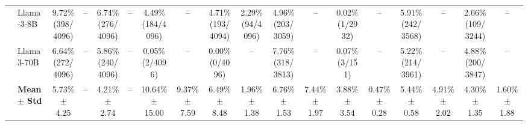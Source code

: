 \begin{table}[t]
{\begin{tabular}{ll*{16}{c}}
 & Llama-3-8B & \makecell[c]{9.72\%\\[-1pt]\scriptsize(398/4096)} & -- & \makecell[c]{6.74\%\\[-1pt]\scriptsize(276/4096)} & -- & \makecell[c]{4.49\%\\[-1pt]\scriptsize(184/4096)} & -- & \makecell[c]{4.71\%\\[-1pt]\scriptsize(193/4094)} & \makecell[c]{2.29\%\\[-1pt]\scriptsize(94/4096)} & \makecell[c]{4.96\%\\[-1pt]\scriptsize(203/3059)} & -- & \makecell[c]{0.02\%\\[-1pt]\scriptsize(1/2932)} & -- & \makecell[c]{5.91\%\\[-1pt]\scriptsize(242/3568)} & -- & \makecell[c]{2.66\%\\[-1pt]\scriptsize(109/3244)} & -- \\
 & Llama3-70B & \makecell[c]{6.64\%\\[-1pt]\scriptsize(272/4096)} & -- & \makecell[c]{5.86\%\\[-1pt]\scriptsize(240/4096)} & -- & \makecell[c]{0.05\%\\[-1pt]\scriptsize(2/4096)} & -- & \makecell[c]{0.00\%\\[-1pt]\scriptsize(0/4096)} & -- & \makecell[c]{7.76\%\\[-1pt]\scriptsize(318/3813)} & -- & \makecell[c]{0.07\%\\[-1pt]\scriptsize(3/151)} & -- & \makecell[c]{5.22\%\\[-1pt]\scriptsize(214/3961)} & -- & \makecell[c]{4.88\%\\[-1pt]\scriptsize(200/3847)} & -- \\
\midrule
 & \textbf{Mean $\pm$ Std} & 5.73\% $\pm$ 4.25 & -- & 4.21\% $\pm$ 2.74 & -- & 10.64\% $\pm$ 15.00 & 9.37\% $\pm$ 7.59 & 6.49\% $\pm$ 8.48 & 1.96\% $\pm$ 1.38 & 6.76\% $\pm$ 1.53 & 7.44\% $\pm$ 1.97 & 3.88\% $\pm$ 3.54 & 0.47\% $\pm$ 0.28 & 5.44\% $\pm$ 0.58 & 4.91\% $\pm$ 2.02 & 4.30\% $\pm$ 1.35 & 1.60\% $\pm$ 1.88 \\
\midrule

\end{tabular}}
\end{table}

